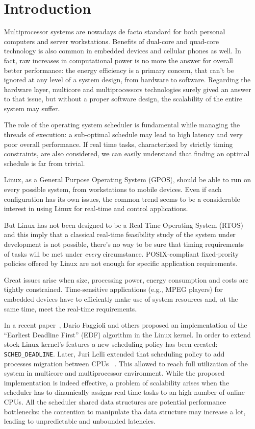 \chapter{Introduction\label{chap:introduction}}

Multiprocessor systems are nowadays de facto standard for both personal
computers and server workstations. Benefits of dual-core and quad-core
technology is also common in embedded devices and cellular phones as
well. In fact, raw increases in computational power is no more the answer 
for overall better performance: the energy efficiency is a 
primary concern, that can't be ignored at any level of a system design, 
from hardware to software. Regarding the hardware layer, multicore and multiprocessors 
technologies surely gived an answer to that issue, but without a proper software 
design, the scalability of the entire system may suffer.

The role of the operating system scheduler is fundamental while managing
the threads of execution: a sub-optimal schedule may lead to high latency
and very poor overall performance. If real time tasks, characterized by 
strictly timing constraints, are also considered, we can easily understand 
that finding an optimal schedule is far from trivial.

Linux, as a General Purpose Operating System (GPOS), should be able
to run on every possible system, from workstations to mobile devices.
Even if each configuration has its own issues, the common trend seems
to be a considerable interest in using Linux for real-time and control
applications.

But Linux has not been designed to be a Real-Time Operating System (RTOS)
and this imply that a classical real-time feasibility study of the
system under development is not possible, there's no way to be sure that
timing requirements of tasks will be met under \emph{every} circumstance.
POSIX-compliant fixed-prority policies offered by Linux are not enough
for specific application requirements.

Great issues arise when size, processing power, energy consumption and
costs are tightly constrained. Time-sensitive applications (e.g., MPEG
players) for embedded devices have to efficiently make use of system
resources and, at the same time, meet the real-time requirements.

In a recent paper~\cite{SCHEDDEAD}, Dario Faggioli and others proposed an
implementation of the ``Earliest Deadline First'' (EDF) algorithm
in the Linux kernel. In order to extend stock Linux kernel's features
a new scheduling policy has been created: \texttt{SCHED\_DEADLINE}. Later,
Juri Lelli extended that scheduling policy to add processes migration
between CPUs ~\cite{lelli2011efficient}. This allowed to reach full utilization of the
system in multicore and multiprocessor environment. While the proposed
implementation is indeed effective, a problem of scalability arises
when the scheduler has to dinamically assigns real-time tasks to
an high number of online CPUs. All the scheduler shared data structures are
potential performance bottlenecks: the contention to manipulate tha data 
structure may increase a lot, leading to unpredictable and unbounded 
latencies.


